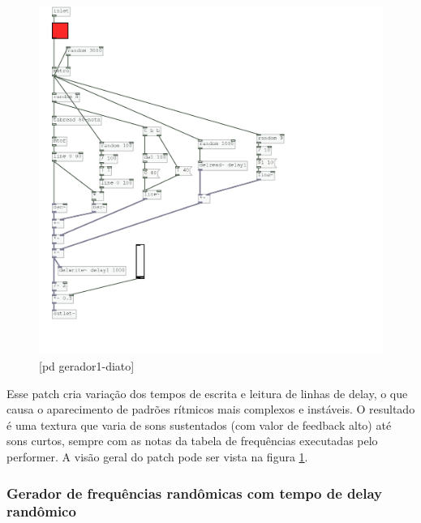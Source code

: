 \documentclass[draft]{ppgmus}
\begin{document}
\begin{figure}
\includegraphics[scale=.6]{gerador-sintese1-diato}
\caption{[pd gerador1-diato]}
\label{gerador1diato}
\end{figure}


Esse patch cria variação dos tempos de escrita e leitura de linhas de delay, o que causa o
aparecimento de padrões rítmicos mais complexos e instáveis.
O resultado é uma textura que varia de sons sustentados (com valor de feedback alto) até
sons curtos, sempre com as notas da tabela de frequências executadas pelo performer.
A visão geral do patch pode ser vista na figura \ref{gerador1diato}.


\subsubsection{Gerador de frequências randômicas com tempo de delay randômico}
\end{document}
